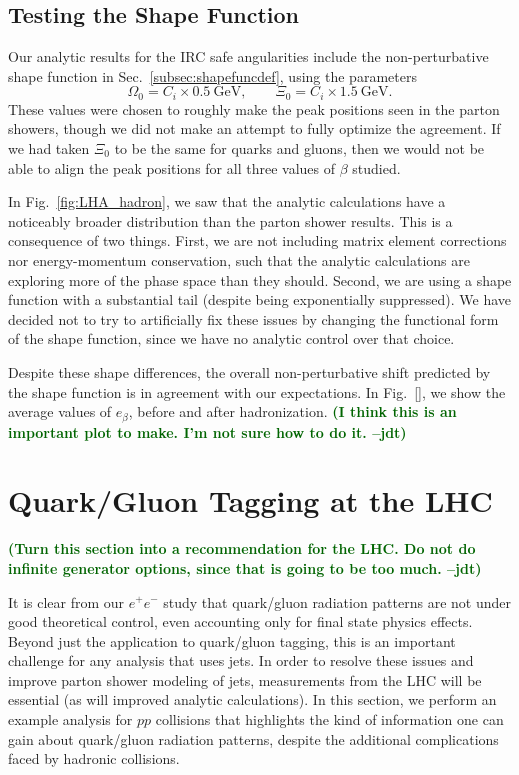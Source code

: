 \documentclass[11pt,letterpaper]{article}
\newcommand{\GeV}{\text{GeV}}
\DeclareRobustCommand{\Sec}[1]{Sec.~\ref{#1}}
\DeclareRobustCommand{\Fig}[1]{Fig.~\ref{#1}}
\newcommand{\be}{\begin{equation}}
\newcommand{\ee}{\end{equation}}
\newcommand{\jdt}[1]{\textbf{\textcolor{darkgreen}{(#1 --jdt)}}}
\begin{document}
\subsection{Testing the Shape Function}
\label{subsec:testingshape}

Our analytic results for the IRC safe angularities include the non-perturbative shape function in \Sec{subsec:shapefuncdef}, using the parameters
\be
\Omega_0 = C_i \times 0.5~\GeV, \qquad \Xi_0 = C_i \times 1.5~\GeV.
\ee
These values were chosen to roughly make the peak positions seen in the parton showers, though we did not make an attempt to fully optimize the agreement.  If we had taken $\Xi_0$ to be the same for quarks and gluons, then we would not be able to align the peak positions for all three values of $\beta$ studied.

In \Fig{fig:LHA_hadron}, we saw that the analytic calculations have a noticeably broader distribution than the parton shower results.  This is a consequence of two things.  First, we are not including matrix element corrections nor energy-momentum conservation, such that the analytic calculations are exploring more of the phase space than they should.    Second, we are using a shape function with a substantial tail (despite being exponentially suppressed).  We have decided not to try to artificially fix these issues by changing the functional form of the shape function, since we have no analytic control over that choice.   

Despite these shape differences, the overall non-perturbative shift predicted by the shape function is in agreement with our expectations.  In \Fig{}, we show the average values of $e_\beta$, before and after hadronization.  \jdt{I think this is an important plot to make.  I'm not sure how to do it.}

\clearpage


\section{Quark/Gluon Tagging at the LHC}
\label{sec:pp}

\jdt{Turn this section into a recommendation for the LHC.  Do not do infinite generator options, since that is going to be too much.}

It is clear from our $e^+e^-$ study that quark/gluon radiation patterns are not under good theoretical control, even accounting only for final state physics effects.  Beyond just the application to quark/gluon tagging, this is an important challenge for any analysis that uses jets.  In order to resolve these issues and improve parton shower modeling of jets, measurements from the LHC will be essential (as will improved analytic calculations).  In this section, we perform an example analysis for $pp$ collisions that highlights the kind of information one can gain about quark/gluon radiation patterns, despite the additional complications faced by hadronic collisions.
\end{document}
